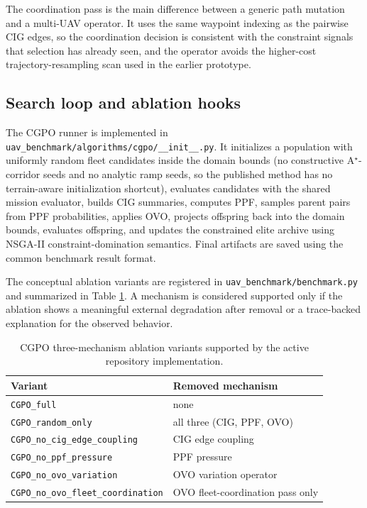 \documentclass[a4paper,fleqn]{cas-dc}
\begin{document}
The coordination pass is the main difference between a generic path mutation and a multi-UAV operator. It uses the same waypoint indexing as the pairwise CIG edges, so the coordination decision is consistent with the constraint signals that selection has already seen, and the operator avoids the higher-cost trajectory-resampling scan used in the earlier prototype.

\subsection{Search loop and ablation hooks}

The CGPO runner is implemented in \texttt{uav\_benchmark/algorithms/cgpo/\_\_init\_\_.py}. It initializes a population with uniformly random fleet candidates inside the domain bounds (no constructive A$^\star$-corridor seeds and no analytic ramp seeds, so the published method has no terrain-aware initialization shortcut), evaluates candidates with the shared mission evaluator, builds CIG summaries, computes PPF, samples parent pairs from PPF probabilities, applies OVO, projects offspring back into the domain bounds, evaluates offspring, and updates the constrained elite archive using NSGA-II constraint-domination semantics. Final artifacts are saved using the common benchmark result format.

The conceptual ablation variants are registered in \texttt{uav\_benchmark/benchmark.py} and summarized in Table \ref{tab:ablation-variants}. A mechanism is considered supported only if the ablation shows a meaningful external degradation after removal or a trace-backed explanation for the observed behavior.

\begin{table}[t]
\centering
\small
\caption{CGPO three-mechanism ablation variants supported by the active repository implementation.}
\label{tab:ablation-variants}
\begin{tabular}{ll}
\toprule
Variant & Removed mechanism \\
\midrule
\texttt{CGPO\_full} & none \\
\texttt{CGPO\_random\_only} & all three (CIG, PPF, OVO) \\
\texttt{CGPO\_no\_cig\_edge\_coupling} & CIG edge coupling \\
\texttt{CGPO\_no\_ppf\_pressure} & PPF pressure \\
\texttt{CGPO\_no\_ovo\_variation} & OVO variation operator \\
\texttt{CGPO\_no\_ovo\_fleet\_coordination} & OVO fleet-coordination pass only \\
\bottomrule
\end{tabular}
\end{table}
\end{document}
